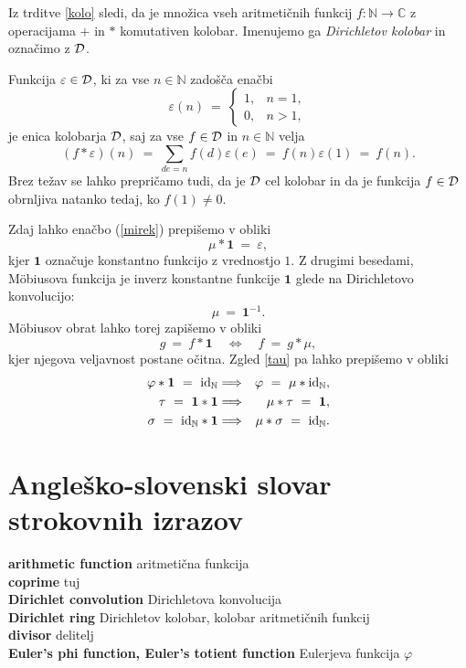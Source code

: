 \documentclass[a4paper,12pt]{article}
\def\N{\mathbb{N}} %
\def\C{\mathbb{C}} %
\newcommand{\geslo}[2]{\noindent\textbf{#1} \quad \hangindent=1cm #2\\[-1pc]}
\begin{document}
Iz trditve \ref{kolo} sledi, da je množica vseh aritmetičnih funkcij $f: \N \to \C$ z operacijama $+$ in $*$ komutativen kolobar. Imenujemo ga {\em Dirichletov kolobar} in označimo z $\cal D$. 

Funkcija $\varepsilon \in {\cal D}$, ki za vse $n \in \N$ zadošča enačbi
\[
\varepsilon(n)\ =\ \left\{
\begin{array}{ll}
1, & n = 1, \\
0, & n > 1,
\end{array}
\right.
\]
je enica kolobarja $\cal D$, saj za vse $f \in {\cal D}$ in $n \in \N$ velja
\[
(f * \varepsilon)(n) \ =\ \sum_{d e = n} f(d)\varepsilon(e) \ =\ f(n)\varepsilon(1) \ =\ f(n).
\]
Brez težav se lahko prepričamo tudi, da je $\cal D$ cel kolobar in da je funkcija $f \in {\cal D}$
obrnljiva natanko tedaj, ko $f(1) \ne 0$.

Zdaj lahko enačbo (\ref{mirek}) prepišemo v obliki
\[
\mu * \mathbf{1}\ = \ \varepsilon,
\]
kjer $\mathbf{1}$ označuje konstantno funkcijo z vrednostjo $1$. Z drugimi besedami, M\"obiusova funkcija
je inverz konstantne funkcije $\mathbf{1}$ glede na Dirichletovo konvolucijo:
\[
\mu \ =\  \mathbf{1}^{-1}.
\]
M\"obiusov obrat lahko torej zapišemo v obliki
\[
g\ =\ f * \mathbf{1} \quad \Longleftrightarrow \quad f\ =\ g * \mu,
\]
kjer njegova veljavnost postane očitna. Zgled \ref{tau} pa lahko prepišemo v obliki
\begin{eqnarray*}
\varphi * \mathbf{1} \ =\ {\rm id}_\N &\Longrightarrow& \varphi\ =\ \mu * {\rm id}_\N, \\
\tau \ =\ \mathbf{1} * \mathbf{1} &\Longrightarrow& \mu * \tau \ =\ \mathbf{1}, \\
\sigma \ =\ {\rm id}_\N * \mathbf{1} &\Longrightarrow& \mu * \sigma \ =\ {\rm id}_\N.
\end{eqnarray*}


\section*{Angleško-slovenski slovar strokovnih izrazov}


\geslo{arithmetic function}{aritmetična funkcija}

\geslo{coprime}{tuj}

\geslo{Dirichlet convolution}{Dirichletova konvolucija}

\geslo{Dirichlet ring}{Dirichletov kolobar, kolobar aritmetičnih funkcij}

\geslo{divisor}{delitelj}

\geslo{Euler's phi function, Euler's totient function}{Eulerjeva funkcija $\varphi$}
\end{document}
